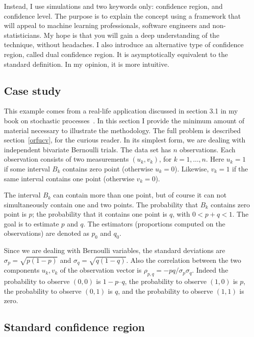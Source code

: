 \documentclass[oneside,10pt]{book}
\begin{document}
Instead, I use simulations and two keywords only: confidence region, and confidence level. The purpose is to explain the concept using a framework that will appeal to machine learning professionals, software engineers and non-statisticians. My hope is that you will gain a deep understanding of the technique, without headaches. I also introduce an alternative type of confidence region, called
dual confidence region. It is asymptotically equivalent to the standard definition. In my opinion, it is more intuitive.


\subsection{Case study}\label{sdxcxza}

This example comes from a real-life application discussed in section 3.1 in my book on stochastic processes~\cite{vgsimulnew}. In this section I provide the minimum amount of material necessary to illustrate the methodology.
The full problem is described  section~\ref{orfucv}, for the curious reader. In its simplest form, we are dealing with independent \textcolor{index}{bivariate Bernoulli trials}. The data set has $n$ observations. Each observation consists of two measurements
$(u_k, v_k)$, for $k=1,\dots, n$. Here $u_k = 1$ if some interval $B_k$ contains zero point (otherwise $u_k = 0$).
 Likewise, $v_k = 1$ if the same interval contains one point (otherwise $v_k = 0$).

The interval $B_k$ can contain more than one point, but of course it can not simultaneously contain one and two points. The probability that $B_k$ contains zero point is $p$; the probability that it contains one point is $q$, with $0< p+q <1$. The goal is to estimate $p$ and $q$. The estimators (proportions computed on the observations) are denoted as $p_0$ and $q_0$.

Since we are dealing with Bernoulli variables, the standard deviations are $\sigma_p = \sqrt{p(1-p)}$ and $\sigma_q = \sqrt{q(1-q)}$. Also the correlation between the two components $u_k, v_k$ of the observation vector is $\rho_{p,q} = -pq / \sigma_p \sigma_q$. Indeed the probability to observe $(0, 0)$ is $1-p–q$, the probability to observe $(1, 0)$ is $p$, the probability to observe $(0, 1)$ is $q$, and the probability to observe $(1, 1)$ is zero.

\subsection{Standard confidence region}
\end{document}
